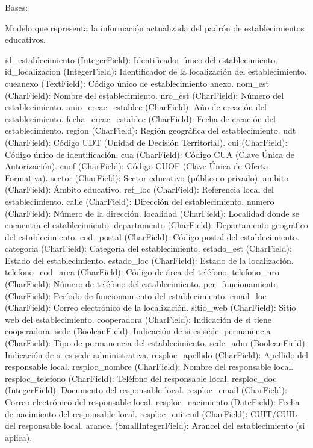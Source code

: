 \documentclass[letterpaper,10pt,spanish]{sphinxmanual}
\begin{document}
\begin{fulllineitems}

\pysigstartsignatures
{}
\pysigstopsignatures
\sphinxAtStartPar
Bases: 

\sphinxAtStartPar
Modelo que representa la información actualizada del padrón de establecimientos educativos.
\begin{description}
\sphinxAtStartPar
id\_establecimiento (IntegerField): Identificador único del establecimiento.
id\_localizacion (IntegerField): Identificador de la localización del establecimiento.
cueanexo (TextField): Código único de establecimiento anexo.
nom\_est (CharField): Nombre del establecimiento.
nro\_est (CharField): Número del establecimiento.
anio\_creac\_establec (CharField): Año de creación del establecimiento.
fecha\_creac\_establec (CharField): Fecha de creación del establecimiento.
region (CharField): Región geográfica del establecimiento.
udt (CharField): Código UDT (Unidad de Decisión Territorial).
cui (CharField): Código único de identificación.
cua (CharField): Código CUA (Clave Única de Autorización).
cuof (CharField): Código CUOF (Clave Única de Oferta Formativa).
sector (CharField): Sector educativo (público o privado).
ambito (CharField): Ámbito educativo.
ref\_loc (CharField): Referencia local del establecimiento.
calle (CharField): Dirección del establecimiento.
numero (CharField): Número de la dirección.
localidad (CharField): Localidad donde se encuentra el establecimiento.
departamento (CharField): Departamento geográfico del establecimiento.
cod\_postal (CharField): Código postal del establecimiento.
categoria (CharField): Categoría del establecimiento.
estado\_est (CharField): Estado del establecimiento.
estado\_loc (CharField): Estado de la localización.
telefono\_cod\_area (CharField): Código de área del teléfono.
telefono\_nro (CharField): Número de teléfono del establecimiento.
per\_funcionamiento (CharField): Período de funcionamiento del establecimiento.
email\_loc (CharField): Correo electrónico de la localización.
sitio\_web (CharField): Sitio web del establecimiento.
cooperadora (CharField): Indicación de si tiene cooperadora.
sede (BooleanField): Indicación de si es sede.
permanencia (CharField): Tipo de permanencia del establecimiento.
sede\_adm (BooleanField): Indicación de si es sede administrativa.
resploc\_apellido (CharField): Apellido del responsable local.
resploc\_nombre (CharField): Nombre del responsable local.
resploc\_telefono (CharField): Teléfono del responsable local.
resploc\_doc (IntegerField): Documento del responsable local.
resploc\_email (CharField): Correo electrónico del responsable local.
resploc\_nacimiento (DateField): Fecha de nacimiento del responsable local.
resploc\_cuitcuil (CharField): CUIT/CUIL del responsable local.
arancel (SmallIntegerField): Arancel del establecimiento (si aplica).


\end{description}
\end{fulllineitems}
\end{document}

